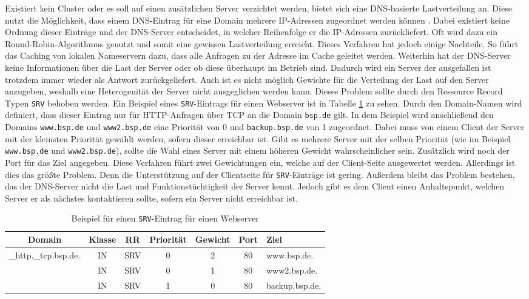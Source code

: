 \documentclass[a4paper, 12pt, BCOR10mm, DIV12, toc=bibliography, toc=listof, german]{scrbook}
\begin{document}
			Existiert kein Cluster oder es soll auf einen zusätzlichen Server verzichtet werden, bietet
			sich eine DNS-basierte Lastverteilung an. Diese nutzt die Möglichkeit, dass einem DNS-Eintrag
			für eine Domain mehrere IP-Adressen zugeordnet werden können \cite{rfc1034}. Dabei existiert
			keine Ordnung dieser Einträge und der DNS-Server entscheidet, in welcher Reihenfolge er die
			IP-Adressen zurückliefert. Oft wird dazu ein Round-Robin-Algorithmus genutzt und somit eine
			gewissen Lastverteilung erreicht. Dieses Verfahren hat jedoch einige Nachteile. So führt das
			Caching von lokalen Nameservern dazu, dass alle Anfragen zu der Adresse im Cache geleitet
			werden. Weiterhin hat der DNS-Server keine Informationen über die Last der Server oder ob
			diese überhaupt im Betrieb sind. Dadurch wird ein Server der ausgefallen ist trotzdem immer
			wieder als Antwort zurückgeliefert. Auch ist es nicht möglich Gewichte für die Verteilung der
			Last auf den Server anzugeben, weshalb eine Heterogenität der Server nicht ausgeglichen werden
			kann. Dieses Problem sollte durch den Ressource Record Typen \texttt{SRV} \cite{rfc2782}
			behoben werden. Ein Beispiel eines \texttt{SRV}-Eintrags für einen Webserver ist in Tabelle
			\ref{tab:srv} zu sehen. Durch den Domain-Namen wird definiert, dass dieser Eintrag nur für
			HTTP-Anfragen über TCP an die Domain \texttt{bsp.de} gilt. In dem Beispiel wird anschließend
			den Domains \texttt{www.bsp.de} und \texttt{www2.bsp.de} eine Priorität von 0 und
			\texttt{backup.bsp.de} von 1 zugeordnet. Dabei muss von einem Client der Server mit der
			kleinsten Priorität gewählt werden, sofern dieser erreichbar ist. Gibt es mehrere Server mit
			der selben Priorität (wie im Beispiel \texttt{www.bsp.de} und \texttt{www2.bsp.de}), sollte
			die Wahl eines Server mit einem höheren Gewicht wahrscheinlicher sein. Zusätzlich wird noch
			der Port für das Ziel angegeben. Diese Verfahren führt zwei Gewichtungen ein, welche auf der
			Client-Seite ausgewertet werden. Allerdings ist dies das größte Problem. Denn die
			Unterstützung auf der Clientseite für \texttt{SRV}-Einträge ist gering. Außerdem bleibt das
			Problem bestehen, das der DNS-Server nicht die Last und Funktionstüchtigkeit der Server kennt.
			Jedoch gibt es dem Client einen Anhaltspunkt, welchen Server er als nächstes kontaktieren
			sollte, sofern ein Server nicht erreichbar ist.

			\begin{table}
				\centering
				\begin{tabular}{|ccccccl|}\hline
				 Domain & Klasse & RR & Priorität & Gewicht & Port & Ziel \\\hline\hline
					\_http.\_tcp.bsp.de. & IN & SRV & 0 & 2 & 80 & www.bsp.de. \\	
					& IN & SRV & 0 & 1 & 80 & www2.bsp.de. \\	
					& IN & SRV & 1 & 0 & 80 & backup.bsp.de. \\\hline
				\end{tabular}
				\caption{Beispiel für einen \texttt{SRV}-Eintrag für einen Webserver}
				\label{tab:srv}
			\end{table}
\end{document}
